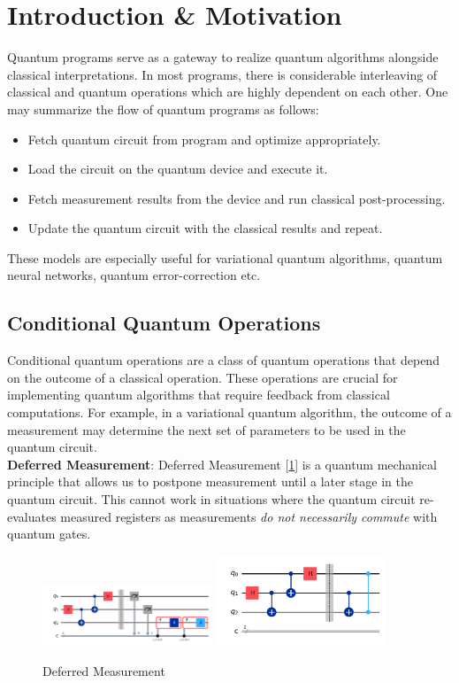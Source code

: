 \documentclass[10pt]{article}
\begin{document}
\section{Introduction \& Motivation}
Quantum programs serve as a gateway to realize quantum algorithms alongside classical interpretations. In most programs, there is considerable interleaving of classical and quantum operations which are highly dependent on each other. One may summarize the flow of quantum programs as follows:
\begin{itemize}
  \item Fetch quantum circuit from program and optimize appropriately.
  \item Load the circuit on the quantum device and execute it.
  \item Fetch measurement results from the device and run classical
post-processing.
  \item Update the quantum circuit with the classical results and repeat.
\end{itemize}
These models are especially useful for variational quantum algorithms, quantum neural networks, quantum error-correction etc. \\

\subsection{Conditional Quantum Operations}
Conditional quantum operations are a class of quantum operations that depend on the outcome of a classical operation. These operations are crucial for implementing quantum algorithms that require feedback from classical computations. For example, in a variational quantum algorithm, the outcome of a measurement may determine the next set of parameters to be used in the quantum circuit. \\

\textbf{Deferred Measurement}: Deferred Measurement [\ref{fig:deferred}] is a quantum mechanical principle that allows us to postpone measurement until a later stage in the quantum circuit. This cannot work in situations where the quantum circuit re-evaluates measured registers as measurements \emph{do not necessarily commute} with quantum gates. \\

\begin{figure}[h]
\centering
  \includegraphics[width=0.45\textwidth]{Images/def_1.png}
  \includegraphics[width=0.45\textwidth]{Images/def_2.png}
  \caption{Deferred Measurement}
  \label{fig:deferred}
\end{figure}
\end{document}
